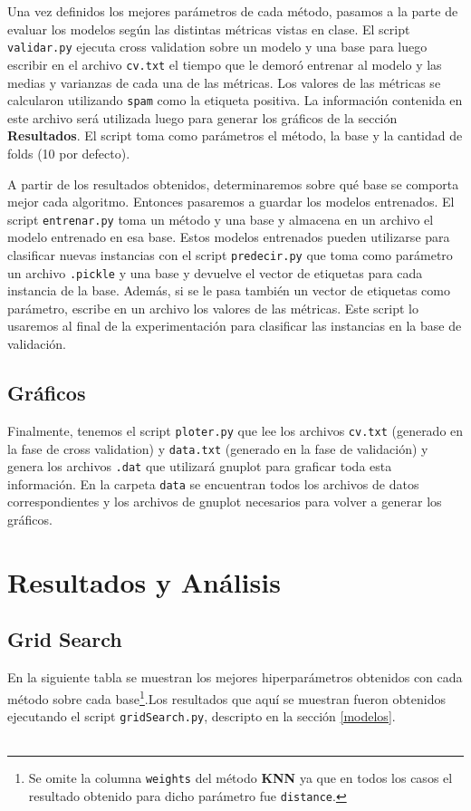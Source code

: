 \documentclass[10pt, a4paper]{article}
\begin{document}
Una vez definidos los mejores parámetros de cada método, pasamos a la parte de evaluar los modelos según las distintas métricas vistas en clase. El script \texttt{validar.py} ejecuta cross validation sobre un modelo y una base para luego escribir en el archivo \texttt{cv.txt} el tiempo que le demoró entrenar al modelo y las medias y varianzas de cada una de las métricas. Los valores de las métricas se calcularon utilizando \texttt{spam} como la etiqueta positiva. La información contenida en este archivo será utilizada luego para generar los gráficos de la sección \textbf{Resultados}. El script toma como parámetros el método, la base y la cantidad de folds (10 por defecto).

A partir de los resultados obtenidos, determinaremos sobre qué base se comporta mejor cada algoritmo. Entonces pasaremos a guardar los modelos entrenados. El script \texttt{entrenar.py} toma un método y una base y almacena en un archivo el modelo entrenado en esa base. Estos modelos entrenados pueden utilizarse para clasificar nuevas instancias con el script \texttt{predecir.py} que toma como parámetro un archivo \texttt{.pickle} y una base y devuelve el vector de etiquetas para cada instancia de la base. Además, si se le pasa también un vector de etiquetas como parámetro, escribe en un archivo los valores de las métricas. Este script lo usaremos al final de la experimentación para clasificar las instancias en la base de validación.

\subsection{Gráficos}

Finalmente, tenemos el script \texttt{ploter.py} que lee los archivos \texttt{cv.txt} (generado en la fase de cross validation) y \texttt{data.txt} (generado en la fase de validación) y genera los archivos \texttt{.dat} que utilizará gnuplot para graficar toda esta información. En la carpeta \texttt{data} se encuentran todos los archivos de datos correspondientes y los archivos de gnuplot necesarios para volver a generar los gráficos.

\section{Resultados y Análisis}

\subsection{Grid Search}
En la siguiente tabla se muestran los mejores hiperparámetros obtenidos con cada método sobre cada base\footnote{Se omite la columna \texttt{weights} del método \textbf{KNN} ya que en todos los casos el resultado obtenido para dicho parámetro fue \texttt{distance}.}.Los resultados que aquí se muestran fueron obtenidos ejecutando el script \texttt{gridSearch.py}, descripto en la sección \ref{modelos}.
\\\\
\end{document}

